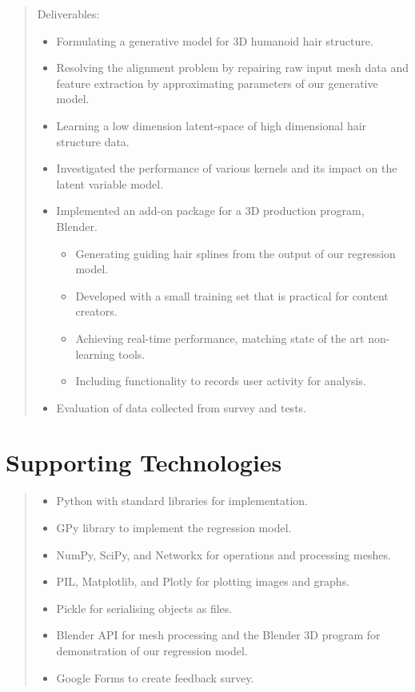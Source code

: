 \documentclass[ %
author={Dillon Keith Diep},
supervisor={Dr. Carl Henrik Ek},
degree={MEng},
title={ART-CG:},
subtitle={Assisted Real-time Content Generation of 3D Hair by Learning Manifolds},
type={Research},
year={2017} ]{dissertation}
\begin{document}
\begin{quote}
	Deliverables:
	\begin{itemize}
		\item Formulating a generative model for 3D humanoid hair structure.
		\item Resolving the alignment problem by repairing raw input mesh data and feature extraction by approximating parameters of our generative model.
		\item Learning a low dimension latent-space of high dimensional hair structure data.
		\item Investigated the performance of various kernels and its impact on the latent variable model.
		\item Implemented an add-on package for a 3D production program, Blender.
		\begin{itemize}
			\item Generating guiding hair splines from the output of our regression model.
			\item Developed with a small training set that is practical for content creators.
			\item Achieving real-time performance, matching state of the art non-learning tools.
			\item Including functionality to records user activity for analysis.
		\end{itemize}
		\item Evaluation of data collected from survey and tests.
	\end{itemize}
\end{quote}


\chapter*{Supporting Technologies}

\begin{quote}
	\noindent
	\begin{itemize}
		\item Python with standard libraries for implementation.
		\item GPy library to implement the regression model.
		\item NumPy, SciPy, and Networkx for operations and processing meshes.
		\item PIL, Matplotlib, and Plotly for plotting images and graphs.
		\item Pickle for serialising objects as files.
		\item Blender API for mesh processing and the Blender 3D program for demonstration of our regression model.
		\item Google Forms to create feedback survey.
	\end{itemize}
\end{quote}
\end{document}
